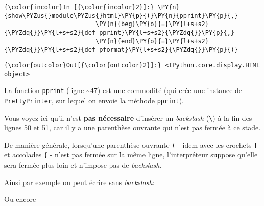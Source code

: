     \begin{Verbatim}[commandchars=\\\{\},frame=single,framerule=0.3mm,rulecolor=\color{cellframecolor}]
{\color{incolor}In [{\color{incolor}2}]:} \PY{n}{show\PYZus{}module\PYZus{}html}\PY{p}{(}\PY{n}{pprint}\PY{p}{,} 
                         \PY{n}{beg}\PY{o}{=}\PY{l+s+s2}{\PYZdq{}}\PY{l+s+s2}{def pprint}\PY{l+s+s2}{\PYZdq{}}\PY{p}{,}
                         \PY{n}{end}\PY{o}{=}\PY{l+s+s2}{\PYZdq{}}\PY{l+s+s2}{def pformat}\PY{l+s+s2}{\PYZdq{}}\PY{p}{)}
\end{Verbatim}


\begin{Verbatim}[commandchars=\\\{\},frame=single,framerule=0.3mm,rulecolor=\color{cellframecolor}]
{\color{outcolor}Out[{\color{outcolor}2}]:} <IPython.core.display.HTML object>
\end{Verbatim}
            
    La fonction \texttt{pprint} (ligne \textasciitilde{}47) est une
commodité (qui crée une instance de \texttt{PrettyPrinter}, sur lequel
on envoie la méthode \texttt{pprint}).

Vous voyez ici qu'il n'est \textbf{pas nécessaire} d'insérer un
\emph{backslash} (\texttt{\textbackslash{}}) à la fin des lignes 50 et
51, car il y a une parenthèse ouvrante qui n'est pas fermée à ce stade.

De manière générale, lorsqu'une parenthèse ouvrante \texttt{(} - idem
avec les crochets \texttt{{[}} et accolades \texttt{\{} - n'est pas
fermée sur la même ligne, l'interpréteur suppose qu'elle sera fermée
plus loin et n'impose pas de \emph{backslash}.

    Ainsi par exemple on peut écrire sans \emph{backslash}:

\begin{Shaded}
\begin{Highlighting}[frame=lines,framerule=0.6mm,rulecolor=\color{asisframecolor}]
\OperatorTok{=}\NormalTok{ [ }
   \NormalTok{,}
   \NormalTok{,}
   \NormalTok{,}
   \NormalTok{,}
   \NormalTok{,}
\NormalTok{]}
\end{Highlighting}
\end{Shaded}

Ou encore

\begin{Shaded}
\begin{Highlighting}[frame=lines,framerule=0.6mm,rulecolor=\color{asisframecolor}]
\OperatorTok{=}
\NormalTok{    )}
\end{Highlighting}
\end{Shaded}

